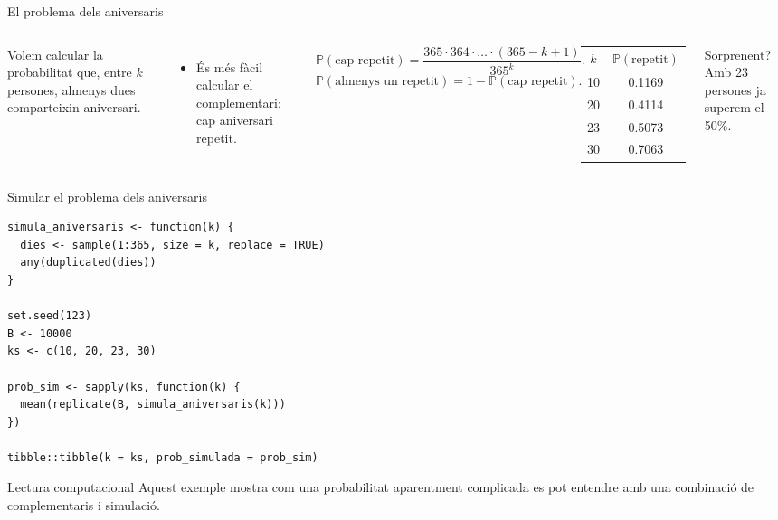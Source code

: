 \documentclass[10pt,aspectratio=169]{beamer}
\newcommand{\Prob}{\mathbb{P}}
\begin{document}
\begin{frame}{El problema dels aniversaris}
\begin{columns}[T]
Volem calcular la probabilitat que, entre $k$ persones, almenys dues comparteixin aniversari.
\vspace{0.15cm}
\begin{itemize}
  \item És més fàcil calcular el complementari: cap aniversari repetit.
\end{itemize}
\[
\Prob(\text{cap repetit})=\frac{365\cdot 364\cdot \ldots \cdot (365-k+1)}{365^k}.
\]
\[
\Prob(\text{almenys un repetit})=1-\Prob(\text{cap repetit}).
\]
\begin{center}
\small
\begin{tabular}{cc}
\toprule
$k$ & $\Prob(\text{repetit})$ \\
\midrule
10 & 0.1169 \\
20 & 0.4114 \\
23 & 0.5073 \\
30 & 0.7063 \\
\bottomrule
\end{tabular}
\end{center}
\begin{alertblock}{Sorprenent?}
Amb 23 persones ja superem el 50\%.
\end{alertblock}
\end{columns}
\end{frame}

\begin{frame}[fragile]{Simular el problema dels aniversaris}
\begin{lstlisting}
simula_aniversaris <- function(k) {
  dies <- sample(1:365, size = k, replace = TRUE)
  any(duplicated(dies))
}

set.seed(123)
B <- 10000
ks <- c(10, 20, 23, 30)

prob_sim <- sapply(ks, function(k) {
  mean(replicate(B, simula_aniversaris(k)))
})

tibble::tibble(k = ks, prob_simulada = prob_sim)
\end{lstlisting}
\vspace{0.2cm}
\begin{block}{Lectura computacional}
Aquest exemple mostra com una probabilitat aparentment complicada es pot entendre amb una combinació de complementaris i simulació.
\end{block}
\end{frame}
\end{document}
